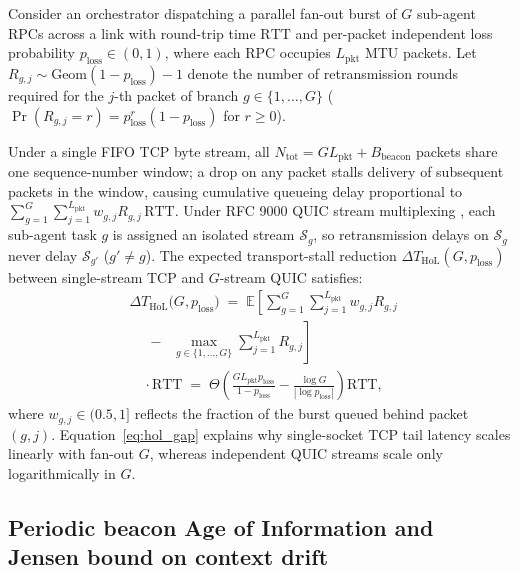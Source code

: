 \documentclass[11pt]{article}
\begin{document}
Consider an orchestrator dispatching a parallel fan-out burst of $G$ sub-agent RPCs across a link with round-trip time $\mathrm{RTT}$ and per-packet independent loss probability $p_{\mathrm{loss}} \allowbreak \in (0,\allowbreak 1)$, where each RPC occupies $L_{\mathrm{pkt}}$ MTU packets. Let $R_{g,j} \sim \mathrm{Geom}(1 - p_{\mathrm{loss}}) - 1$ denote the number of retransmission rounds required for the $j$-th packet of branch $g \in \{1,\allowbreak \dots,\allowbreak G\}$ ($\Pr(R_{g,j} = r) = p_{\mathrm{loss}}^r (1 - p_{\mathrm{loss}})$ for $r \ge 0$).

Under a single FIFO TCP byte stream, all $N_{\mathrm{tot}} = G L_{\mathrm{pkt}} + B_{\mathrm{beacon}}$ packets share one sequence-number window; a drop on any packet stalls delivery of subsequent packets in the window, causing cumulative queueing delay proportional to $\sum_{g=1}^G \sum_{j=1}^{L_{\mathrm{pkt}}} w_{g,j} R_{g,j}\, \mathrm{RTT}$. Under RFC 9000 QUIC stream multiplexing \citep{iyengar2021rfc9000}, each sub-agent task $g$ is assigned an isolated stream $\mathcal{S}_g$, so retransmission delays on $\mathcal{S}_g$ never delay $\mathcal{S}_{g'}$ ($g' \neq g$). The expected transport-stall reduction $\Delta T_{\mathrm{HoL}}(G,\allowbreak p_{\mathrm{loss}})$ between single-stream TCP and $G$-stream QUIC satisfies:
\begin{equation}
\begin{aligned}
&\Delta T_{\mathrm{HoL}}\bigl(G, p_{\mathrm{loss}}\bigr) \;=\; \mathbb{E}\!\left[\sum_{g=1}^{G} \sum_{j=1}^{L_{\mathrm{pkt}}} w_{g,j} R_{g,j} \; \right. \\
&\quad \left. \;-\; \; \max_{g \in \{1,\dots,G\}} \sum_{j=1}^{L_{\mathrm{pkt}}} R_{g,j}\right] \\
&\quad \cdot \mathrm{RTT} \;=\; \Theta\!\left(\frac{G L_{\mathrm{pkt}} p_{\mathrm{loss}}}{1 - p_{\mathrm{loss}}} - \frac{\log G}{|\log p_{\mathrm{loss}}|}\right)\mathrm{RTT},
\end{aligned}
\label{eq:hol_gap}
\end{equation}
where $w_{g,j} \in (0.5,\allowbreak 1]$ reflects the fraction of the burst queued behind packet $(g, j)$. Equation~\eqref{eq:hol_gap} explains why single-socket TCP tail latency scales linearly with fan-out $G$, whereas independent QUIC streams scale only logarithmically in $G$.

\subsection{Periodic beacon Age of Information and Jensen bound on context drift}
\end{document}

